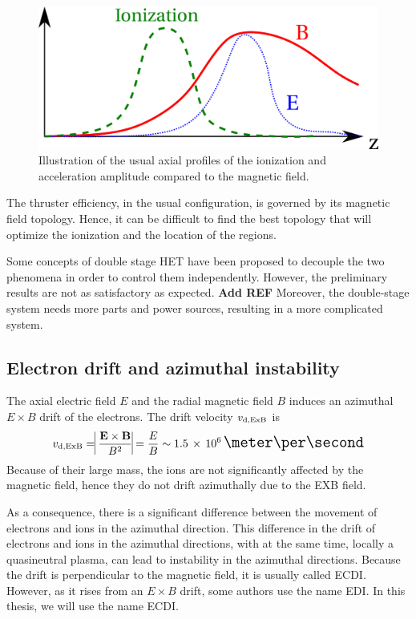 \begin{figure}[hbtp]
  \centering
  \includegraphics[width=\defaultwidth]{zones}
  \caption{Illustration of the usual axial profiles of the ionization and acceleration amplitude compared to the magnetic field.}
  \label{fig-zones}
\end{figure}

The thruster efficiency, in the usual configuration, is governed by its magnetic field topology.
Hence, it can be difficult to find the best topology that will optimize the ionization and the location of the regions.

Some concepts of double stage \ac{HET} have been proposed to decouple the two phenomena in order to control them independently.
However, the preliminary results are not as satisfactory as expected. {\bf Add REF}
Moreover, the double-stage system needs more parts and power sources, resulting in a more complicated system.

\subsection{Electron drift and azimuthal instability}
The axial electric field $E$ and the radial magnetic field $B$ induces an azimuthal $E\times B$ drift of the electrons.
The drift velocity $v_{\rm d, ExB}$ is 
\begin{equation} \label{eq-}
  v_{\rm d, ExB} = \Large\vline \frac{\vect{E} \times \vect{B}}{B^2} \Large\vline = \frac{E}{B} \sim \sn{1.5}{6} \,\meter\per\second
\end{equation}
Because of their large mass, the ions are not significantly affected by the magnetic field, hence they do not drift azimuthally due to the EXB field.

As a consequence, there is a significant difference between the movement of electrons and ions in the azimuthal direction.
This difference in the drift of electrons and ions in the azimuthal directions, with at the same time, locally a quasineutral plasma, can lead to instability in the azimuthal directions.
Because the drift is perpendicular to the magnetic field, it is usually called \ac{ECDI}.
However, as it rises from an $E\times B$ drift, some authors use the name \ac{EDI}.
In this thesis, we will use the name \ac{ECDI}.

